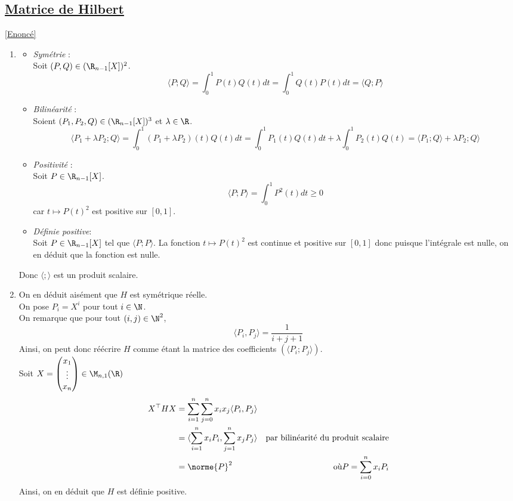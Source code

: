 \documentclass[8pt]{book}
\begin{document}
	\subsection{\underline{Matrice de Hilbert} }
	\label{Matrice de Hilbert corrigé}
	\textcolor{blue}{\hyperref[Matrice de Hilbert]{[Enoncé]}}\\
	\begin{enumerate}[leftmargin=*]
		\item \begin{itemize}
			\item \textit{Symétrie} :\\ Soit $(P,Q)\in(\R_{n-1}[X])^2$.\\
			\[\langle P;Q\rangle=\int_{0}^{1}P(t)Q(t)dt=\int_{0}^{1}Q(t)P(t)dt=\langle Q ; P\rangle\]
			\item \textit{Bilinéarité} :\\ Soient $(P_1, P_2, Q)\in(\R_{n-1}[X])^3$ et $\lambda\in\R$.\\
			\[\langle P_1+\lambda P_2 ; Q\rangle=\int_{0}^{1}(P_1+\lambda P_2)(t)Q(t)dt=\int_{0}^{1}P_1(t)Q(t)dt+\lambda \int_{0}^{1}P_2(t)Q(t)=\langle P_1 ; Q\rangle +\lambda P_2 ; Q\rangle\]
			\item \textit{Positivité} :\\Soit $P\in\R_{n-1}[X]$.
			\[\langle P; P\rangle=\int_{0}^{1}P^2(t)dt \geq 0\] car $t\mapsto P(t)^2$ est positive sur $[0,1]$.\\
			\item \textit{Définie positive}:\\ Soit $P\in\R_{n-1}[X]$ tel que $\langle P ; P\rangle$.
			La fonction $t\mapsto P(t)^2$ est continue et positive sur $[0,1]$ donc puisque l'intégrale est nulle, on en déduit que la fonction est nulle.
		\end{itemize}
		Donc $\langle ; \rangle$ est un produit scalaire.
		\item 
		On en déduit aisément que $H$ est symétrique réelle.\\
		On pose $P_i=X^i$ pour tout $i\in\N$.\\
		On remarque que pour tout $(i,j)\in\N^2$, \[\langle P_i, P_j\rangle =\frac{1}{i+j+1}\]
		Ainsi, on peut donc réécrire $H$ comme étant la matrice des coefficients $\left(\langle P_i ; P_j \rangle\right)$.\\
		Soit $X=\begin{pmatrix}
			x_1\\ \vdots\\x_n
		\end{pmatrix}\in\M_{n,1}(\R)$
		\begin{align*}
			X^\top H X&=\sum_{i=1}^{n}\sum_{j=0}^{n}x_ix_j\langle P_i, P_j\rangle\\
			&=\langle \sum_{i=1}^{n}x_iP_i, \sum_{j=1}^{n}x_jP_j\rangle &\text{par bilinéarité du produit scalaire}\\
			&=\norme{P}^2 &\text{où} P=\sum_{i=0}^{n}x_iP_i\\
		\end{align*}
		Ainsi, on en déduit que $H$ est définie positive.	
	\end{enumerate}
	
\end{document}
